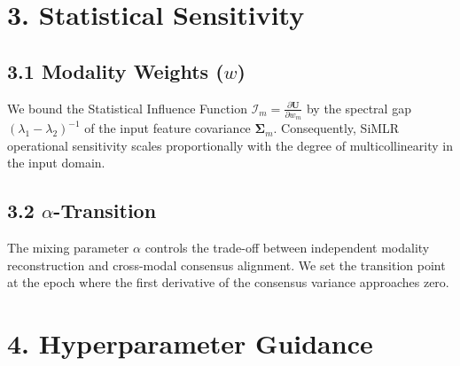 \documentclass[
  letterpaper,
]{report}
\begin{document}
\section{3. Statistical Sensitivity}\label{statistical-sensitivity}

\subsection{\texorpdfstring{3.1 Modality Weights
(\(w\))}{3.1 Modality Weights (w)}}\label{modality-weights-w}

We bound the Statistical Influence Function
\(\mathcal{I}_m = \frac{\partial \mathbf{U}}{\partial w_m}\) by the
spectral gap \((\lambda_1 - \lambda_2)^{-1}\) of the input feature
covariance \(\mathbf{\Sigma}_m\). Consequently, SiMLR operational
sensitivity scales proportionally with the degree of multicollinearity
in the input domain.

\subsection{\texorpdfstring{3.2
\(\alpha\)-Transition}{3.2 \textbackslash alpha-Transition}}\label{alpha-transition}

The mixing parameter \(\alpha\) controls the trade-off between
independent modality reconstruction and cross-modal consensus alignment.
We set the transition point at the epoch where the first derivative of
the consensus variance approaches zero.

\section{4. Hyperparameter Guidance}\label{hyperparameter-guidance}
\end{document}
